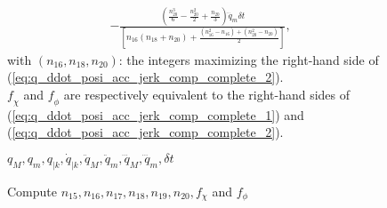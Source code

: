 \begin{figure}[!htbp]
\begin{equation}
\begin{split}
&- \frac{\left(\frac{n_{20}^3}{6}-\frac{n_{20}^2}{2}+\frac{n_{20}}{3}\right)\dddot{q}_{m} \delta t}{\left[n_{16}\left(n_{18}+n_{20}\right)+\frac{\left(n_{16}^2-n_{16}\right)+\left(n_{20}^2-n_{20}\right)}{2}\right]},
\end{split}
\label{eq:q_ddot_posi_acc_jerk_comp_complete_2}
\end{equation} 
with $(n_{16}, n_{18}, n_{20})$: the integers maximizing the right-hand side of (\ref{eq:q_ddot_posi_acc_jerk_comp_complete_2}). \\
$\textit{f}_{\chi}$ and $\textit{f}_{\phi}$ are respectively equivalent to the right-hand sides of (\ref{eq:q_ddot_posi_acc_jerk_comp_complete_1}) and (\ref{eq:q_ddot_posi_acc_jerk_comp_complete_2}). \\
\noindent\begin{minipage}{\textwidth}
\renewcommand\footnoterule{}                  %
\begin{algorithm}[H]
\caption{Compute $n_{15}, n_{16}, n_{17}, n_{18}, n_{19}, n_{20}, f_{\chi}$ and $f_{\phi}$}
\label{alg:compute_n_15_n_16_n_17_n_18_n_19_n_20_f_chi_f_phi}
\begin{algorithmic}[1]
\Require $q_M, q_m, q_{|k}, \dot{q}_{|k}, \ddot{q}_{M},\ddot{q}_{m},\dddot{q}_{M},\dddot{q}_{m}, \delta t$

\end{algorithmic}
\end{algorithm}
\end{minipage}
\end{figure}
